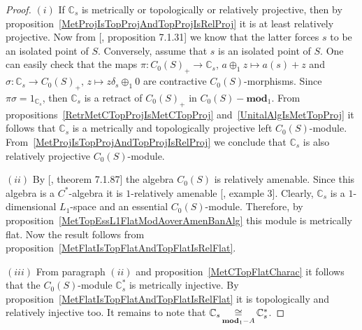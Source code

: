 \begin{proof} $(i)$ If $\mathbb{C}_s$ is metrically or topologically or
relatively projective, then by
proposition~\ref{MetProjIsTopProjAndTopProjIsRelProj} it is at least relatively
projective. Now from [\cite{HelBanLocConvAlg}, proposition 7.1.31] we know that
the latter forces $s$ to be an isolated point of $S$. Conversely, assume that 
$s$ is an isolated point of $S$. One can easily check that the maps
$\pi:{C_0(S)}_+\to\mathbb{C}_s,\, a\oplus_1 z\mapsto a(s)+z$ and
$\sigma:\mathbb{C}_s\to {C_0(S)}_+,\, z\mapsto z\delta_s\oplus_1 0$ are contractive
$C_0(S)$-morphisms. Since $\pi\sigma=1_{\mathbb{C}_s}$, then $\mathbb{C}_s$ is a
retract of ${C_0(S)}_+$ in $C_0(S)-\mathbf{mod}_1$. From
propositions~\ref{RetrMetCTopProjIsMetCTopProj} and~\ref{UnitalAlgIsMetTopProj} 
it follows that $\mathbb{C}_s$ is a metrically and topologically projective left
$C_0(S)$-module. From~\ref{MetProjIsTopProjAndTopProjIsRelProj} we conclude that
$\mathbb{C}_s$ is also relatively projective $C_0(S)$-module.

$(ii)$ By [\cite{HelBanLocConvAlg}, theorem 7.1.87] the algebra $C_0(S)$ is
relatively amenable. Since this algebra is a $C^*$-algebra it is $1$-relatively 
amenable [\cite{RundeAmenConstFour}, example 3]. Clearly, $\mathbb{C}_s$ is a
$1$-dimensional $L_1$-space and an essential $C_0(S)$-module. Therefore, by
proposition~\ref{MetTopEssL1FlatModAoverAmenBanAlg} this module is metrically
flat. Now the result follows from
proposition~\ref{MetFlatIsTopFlatAndTopFlatIsRelFlat}.

$(iii)$ From paragraph $(ii)$ and proposition~\ref{MetCTopFlatCharac} it follows
that the $C_0(S)$-module $\mathbb{C}_s^*$ is metrically injective. By
proposition~\ref{MetFlatIsTopFlatAndTopFlatIsRelFlat} it is topologically and
relatively injective too. It remains to note that
$\mathbb{C}_s\mathop{\mathbin{\cong}}\limits_{\mathbf{mod}_1-A}\mathbb{C}_s^*$. 
\end{proof}

